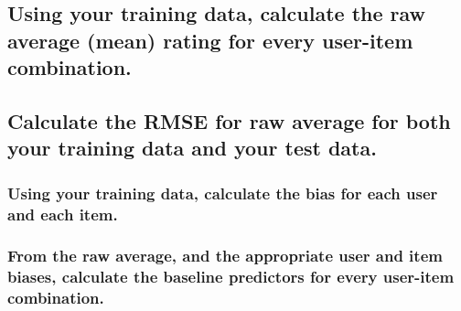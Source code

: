 \documentclass[]{article}
\newenvironment{Shaded}{\begin{snugshade}}{\end{snugshade}}
\newcommand{\CommentTok}[1]{\textcolor[rgb]{0.56,0.35,0.01}{\textit{#1}}}
\begin{document}
\begin{Shaded}
\end{Shaded}

\hypertarget{using-your-training-data-calculate-the-raw-average-mean-rating-for-every-user-item-combination.}{%
\subsection{Using your training data, calculate the raw average (mean)
rating for every user-item
combination.}\label{using-your-training-data-calculate-the-raw-average-mean-rating-for-every-user-item-combination.}}

\hypertarget{calculate-the-rmse-for-raw-average-for-both-your-training-data-and-your-test-data.}{%
\subsection{Calculate the RMSE for raw average for both your training
data and your test
data.}\label{calculate-the-rmse-for-raw-average-for-both-your-training-data-and-your-test-data.}}

\hypertarget{using-your-training-data-calculate-the-bias-for-each-user-and-each-item.}{%
\subsubsection{Using your training data, calculate the bias for each
user and each
item.}\label{using-your-training-data-calculate-the-bias-for-each-user-and-each-item.}}

\hypertarget{from-the-raw-average-and-the-appropriate-user-and-item-biases-calculate-the-baseline-predictors-for-every-user-item-combination.}{%
\subsubsection{From the raw average, and the appropriate user and item
biases, calculate the baseline predictors for every user-item
combination.}\label{from-the-raw-average-and-the-appropriate-user-and-item-biases-calculate-the-baseline-predictors-for-every-user-item-combination.}}
\end{document}

